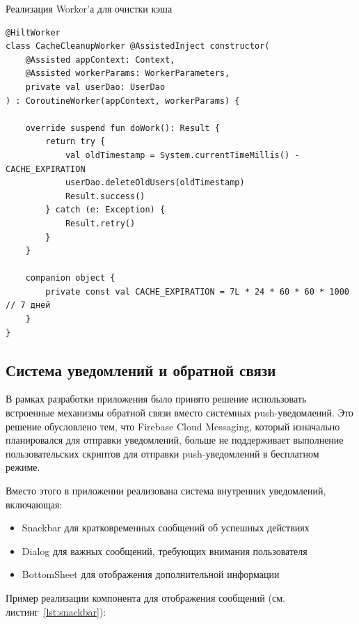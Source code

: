 \documentclass[14pt, russian]{scrartcl}
\begin{document}
\begin{listing}[!htb]
\caption{Реализация Worker'а для очистки кэша}
\label{lst:worker}
\begin{verbatim}
@HiltWorker
class CacheCleanupWorker @AssistedInject constructor(
    @Assisted appContext: Context,
    @Assisted workerParams: WorkerParameters,
    private val userDao: UserDao
) : CoroutineWorker(appContext, workerParams) {

    override suspend fun doWork(): Result {
        return try {
            val oldTimestamp = System.currentTimeMillis() - CACHE_EXPIRATION
            userDao.deleteOldUsers(oldTimestamp)
            Result.success()
        } catch (e: Exception) {
            Result.retry()
        }
    }

    companion object {
        private const val CACHE_EXPIRATION = 7L * 24 * 60 * 60 * 1000 // 7 дней
    }
}
\end{verbatim}
\end{listing}

\subsection{Система уведомлений и обратной связи}\label{sect:notifications}

В рамках разработки приложения было принято решение использовать встроенные механизмы обратной связи вместо системных push-уведомлений. Это решение обусловлено тем, что Firebase Cloud Messaging, который изначально планировался для отправки уведомлений, больше не поддерживает выполнение пользовательских скриптов для отправки push-уведомлений в бесплатном режиме.

Вместо этого в приложении реализована система внутренних уведомлений, включающая:

\begin{itemize}
\item Snackbar для кратковременных сообщений об успешных действиях
\item Dialog для важных сообщений, требующих внимания пользователя
\item BottomSheet для отображения дополнительной информации
\end{itemize}

Пример реализации компонента для отображения сообщений (см. листинг~\ref{lst:snackbar}):
\end{document}
